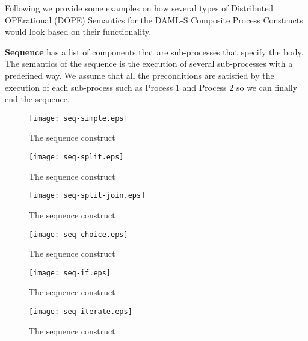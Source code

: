 Following we provide some examples on how several types of Distributed OPErational (DOPE) Semantics for the DAML-S Composite Process Constructs would look based on their functionality.

\vspace{1em}
\textbf{Sequence} has a list of components that are sub-processes that specify the body. The semantics of the sequence is the execution of several sub-processes with a predefined way. We assume that all the preconditions are satisfied by the execution of each sub-process such as Process 1 and Process 2 so we can finally end the sequence.
\begin{figure}[h]
    \centering
    \texttt{[image: seq-simple.eps]}
    \caption{The sequence construct}
    \label{fig:Conditional effects and outputs}
\end{figure}

\begin{figure}[h]
    \centering
    \texttt{[image: seq-split.eps]}
    \caption{The sequence construct}
    \label{fig:Conditional effects and outputs}
\end{figure}

\begin{figure}[h]
    \centering
    \texttt{[image: seq-split-join.eps]}
    \caption{The sequence construct}
    \label{fig:Conditional effects and outputs}
\end{figure}

\begin{figure}[h]
    \centering
    \texttt{[image: seq-choice.eps]}
    \caption{The sequence construct}
    \label{fig:Conditional effects and outputs}
\end{figure}

\begin{figure}[h]
    \centering
    \texttt{[image: seq-if.eps]}
    \caption{The sequence construct}
    \label{fig:Conditional effects and outputs}
\end{figure}

\begin{figure}[h]
    \centering
    \texttt{[image: seq-iterate.eps]}
    \caption{The sequence construct}
    \label{fig:Conditional effects and outputs}
\end{figure}